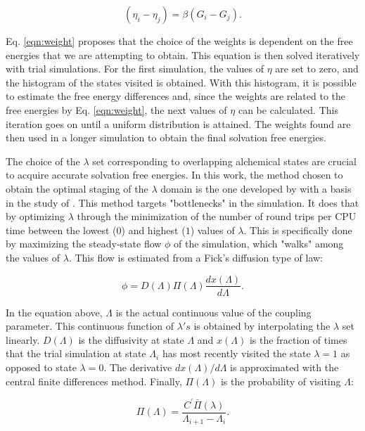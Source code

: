 \documentclass[
	12pt,				%
	openany,			%
	oneside,			%
	a4paper,			%
	english,			%
	brazil				%
	]{abntex2}
\begin{document}
\begin{equation}
(\eta_{i} - \eta_{j}) = \beta(G_i-G_j).
\label{eqn:weight}
\end{equation}

Eq. \eqref{eqn:weight} proposes that the choice of the weights is dependent on the free energies that we are attempting to obtain. This equation is then solved iteratively with trial simulations. For the first simulation, the values of $\eta$ are set to zero, and the histogram of the states visited is obtained. With this histogram, it is possible to estimate the free energy differences and, since the weights are related to the free energies by Eq. \eqref{eqn:weight}, the next values of $\eta$ can be calculated. This iteration goes on until a uniform distribution is attained. The weights found are then used in a longer simulation to obtain the final solvation free energies.

The choice of the $\lambda$ set corresponding to overlapping alchemical states are crucial to acquire accurate solvation free energies. In this work, the method chosen to obtain the optimal staging of the $\lambda$ domain is the one developed by  with a basis in the study of  . This method targets "bottlenecks" in the simulation. It does that by optimizing $\lambda$ through the minimization of the number of round trips per CPU time between the lowest ($0$) and highest ($1$) values of $\lambda$. This is specifically done by maximizing the steady-state flow $\phi$ of the simulation, which "walks" among the values of $\lambda$. This flow is estimated from a Fick's diffusion type of law:

\begin{equation}
\phi = D(\Lambda) \Pi (\Lambda) \dfrac{dx(\Lambda)}{d \Lambda}.
\label{eqn:stream}
\end{equation}

In the equation above, $\Lambda$ is the actual continuous value of the coupling parameter. This continuous function of $\lambda 's$ is obtained by interpolating the $\lambda$ set linearly. $D(\Lambda)$ is the diffusivity at  state $\Lambda$ and $x(\Lambda)$ is the fraction of times that the trial simulation at state $\Lambda_{i}$ has most recently visited the state $\lambda=1$ as opposed to state $\lambda=0$. The derivative ${dx(\Lambda)}/{d \Lambda}$ is approximated with the central finite differences method. Finally, $\Pi (\Lambda)$ is the probability of visiting $\Lambda$:

\begin{equation}
\Pi (\Lambda) = \dfrac{C^{'} \bar{\Pi} (\lambda)}{\Lambda_{i+1} - \Lambda_{i}}.
\label{eqn:plambda}
\end{equation}
\end{document}
